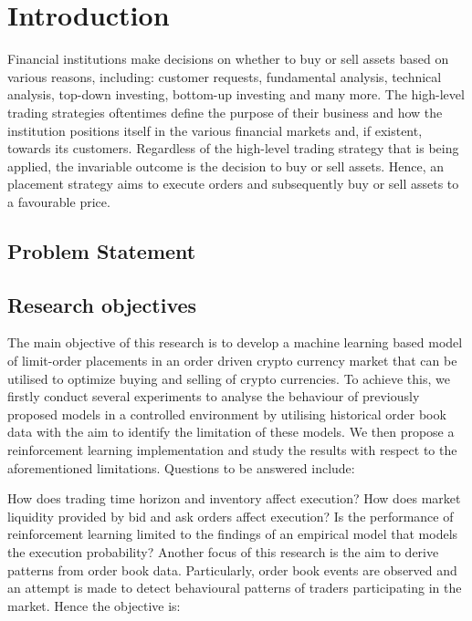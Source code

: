\chapter{Introduction}

Financial institutions make decisions on whether to buy or sell assets based on various reasons, including: customer requests, fundamental analysis\cite{fundamental-analysis}, technical analysis\cite{technical-analysis}, top-down investing\cite{td-investing}, bottom-up investing\cite{bu-investing} and many more. 
The high-level trading strategies oftentimes define the purpose of their business and how the institution positions itself in the various financial markets and, if existent, towards its customers. 
Regardless of the high-level trading strategy that is being applied, the invariable outcome is the decision to buy or sell assets. 
Hence, an placement strategy aims to execute orders and subsequently buy or sell assets to a favourable price.

\section{Problem Statement}

\section{Research objectives}

The main objective of this research is to develop a machine learning based model of limit-order placements in an order driven crypto currency market that can be utilised to optimize buying and selling of crypto currencies. To achieve this, we firstly conduct several experiments to analyse the behaviour of previously proposed models in a controlled environment by utilising historical order book data with the aim to identify the limitation of these models. We then propose a reinforcement learning implementation and study the results with respect to the aforementioned limitations. Questions to be answered include:

How does trading time horizon and inventory affect execution?
How does market liquidity provided by bid and ask orders affect execution?
Is the performance of reinforcement learning limited to the findings of an empirical model that models the execution probability?
Another focus of this research is the aim to derive patterns from order book data. Particularly, order book events are observed and an attempt is made to detect behavioural patterns of traders participating in the market. Hence the objective is:

